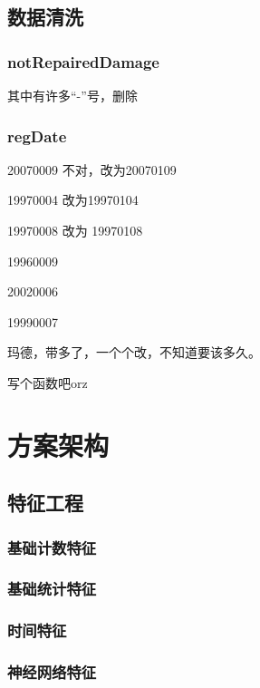 \documentclass{article}
\begin{document}
	\subsection{数据清洗}
	\subsubsection{notRepairedDamage}
	其中有许多“-”号，删除
	\subsubsection{regDate}
	20070009 不对，改为20070109\par 
	19970004 改为19970104\par 
	19970008 改为 19970108\par 
	19960009\par 
	20020006\par 
	19990007\par 
	玛德，带多了，一个个改，不知道要该多久。\par 
	写个函数吧orz  \par 
	\section{方案架构}
	\subsection{特征工程}
	\subsubsection{基础计数特征}
	\subsubsection{基础统计特征}
	\subsubsection{时间特征}
	\subsubsection{神经网络特征}
\end{document}

